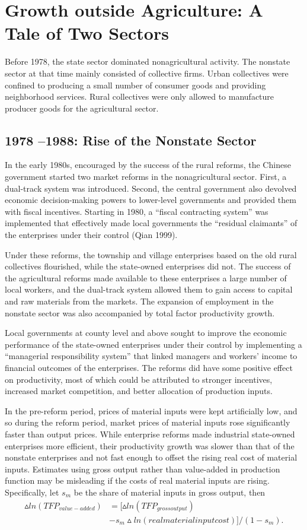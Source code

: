 \documentclass{article}
\begin{document}
    \section*{Growth outside Agriculture: A Tale of Two Sectors}
    Before 1978, the state sector dominated nonagricultural activity. The nonstate sector at that time mainly consisted of collective firms. Urban collectives were confined to producing a small number of consumer goods and providing neighborhood services. Rural collectives were only allowed to manufacture producer goods for the agricultural sector.
    \subsection*{1978 –1988: Rise of the Nonstate Sector}
    In the early 1980s, encouraged by the success of the rural reforms, the Chinese government started two market reforms in the nonagricultural sector. First, a dual-track system was introduced. Second, the central government also devolved economic decision-making powers to lower-level governments and provided them with fiscal incentives. Starting in 1980, a “fiscal contracting system” was implemented that effectively made local governments the “residual claimants” of the enterprises under their control (Qian 1999). 

    Under these reforms, the township and village enterprises based on the old rural collectives flourished, while the state-owned enterprises did not. The success of the agricultural reforms made available to these enterprises a large number of local workers, and the dual-track system allowed them to gain access to capital and raw materials from the markets. The expansion of employment in the nonstate sector was also accompanied by total factor productivity growth.

    Local governments at county level and above sought to improve the economic performance of the state-owned enterprises under their control by implementing a “managerial responsibility system” that linked managers and workers’ income to financial outcomes of the enterprises. The reforms did have some positive effect on productivity, most of which could be attributed to stronger incentives, increased market competition, and better allocation of production inputs.
    
    In the pre-reform period, prices of material inputs were kept artificially low, and so during the reform period, market prices of material inputs rose significantly faster than output prices. While enterprise reforms made industrial state-owned enterprises more efficient, their productivity growth was slower than that of the nonstate enterprises and not fast enough to offset the rising real cost of material inputs. Estimates using gross output rather than value-added in production function may be misleading if the costs of real material inputs are rising. Specifically, let $s_m$ be the share of material inputs in gross output, then 
    \begin{align*}
        \vartriangle ln(TFP_{value-added}) &= [\vartriangle ln(TFP_{gross output})\\
        &-s_m \vartriangle ln(real material input cost)]/(1-s_m).
    \end{align*}
    
\end{document}
